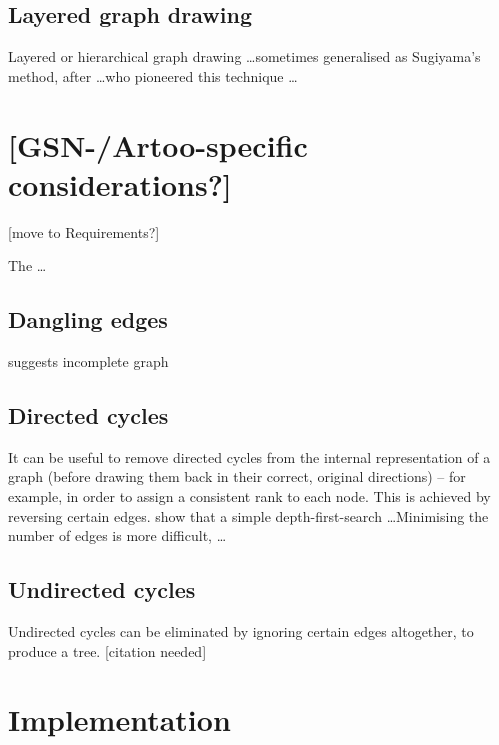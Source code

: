 \subsection{Layered graph drawing}

Layered or hierarchical graph drawing  \ldots sometimes generalised as Sugiyama's method, after \ldots who pioneered this technique \ldots 




\section{[GSN-/Artoo-specific considerations?]}

[move to Requirements?]

The  \ldots



\subsection{Dangling edges}

suggests incomplete graph

\subsection{Directed cycles}

It can be useful to remove directed cycles from the internal representation of a graph
(before drawing them back in their correct, original directions)
-- for example, in order to assign a consistent rank to each node.
This is achieved by reversing certain edges.
\citet{gansner1993} show that a simple depth-first-search \ldots  Minimising the number of edges is more difficult, \citeauthor{gansner1993} \ldots

\subsection{Undirected cycles}

Undirected cycles can be eliminated by ignoring certain edges altogether, to produce a tree.  [citation needed]








\section{Implementation}



